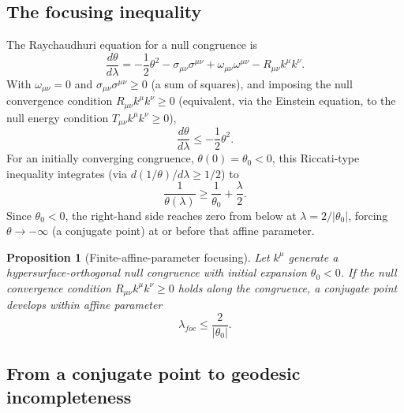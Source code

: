 \documentclass[11pt]{article}
\newtheorem{proposition}{Proposition}
\begin{document}
\subsection{The focusing inequality}

The Raychaudhuri equation for a null congruence is \cite{raychaudhuri1955,wald1984}
\begin{equation}
\frac{d\theta}{d\lambda} = -\frac12\theta^2 - \sigma_{\mu\nu}\sigma^{\mu\nu} + \omega_{\mu\nu}\omega^{\mu\nu} - R_{\mu\nu}k^\mu k^\nu.
\end{equation}
With $\omega_{\mu\nu}=0$ and $\sigma_{\mu\nu}\sigma^{\mu\nu}\geq0$ (a sum of squares), and imposing the null convergence condition $R_{\mu\nu}k^\mu k^\nu \geq 0$ (equivalent, via the Einstein equation, to the null energy condition $T_{\mu\nu}k^\mu k^\nu\geq0$),
\begin{equation}
\frac{d\theta}{d\lambda} \leq -\frac12\theta^2.
\end{equation}
For an initially converging congruence, $\theta(0)=\theta_0<0$, this Riccati-type inequality integrates (via $d(1/\theta)/d\lambda \geq 1/2$) to
\begin{equation}
\frac{1}{\theta(\lambda)} \geq \frac{1}{\theta_0} + \frac{\lambda}{2}.
\end{equation}
Since $\theta_0<0$, the right-hand side reaches zero from below at $\lambda = 2/|\theta_0|$, forcing $\theta\to-\infty$ (a conjugate point) at or before that affine parameter.

\begin{proposition}[Finite-affine-parameter focusing]
\label{prop:focusing}
Let $k^\mu$ generate a hypersurface-orthogonal null congruence with initial expansion $\theta_0<0$. If the null convergence condition $R_{\mu\nu}k^\mu k^\nu\geq0$ holds along the congruence, a conjugate point develops within affine parameter
\begin{equation}
\lambda_{foc} \leq \frac{2}{|\theta_0|}.
\end{equation}
\end{proposition}

\subsection{From a conjugate point to geodesic incompleteness}
\end{document}
